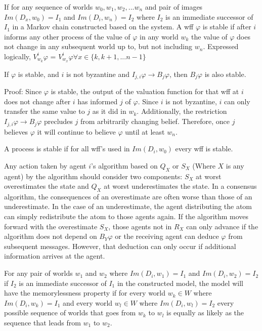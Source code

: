 \begin{pdef}
If for any sequence of worlds $w_0, w_1, w_2, ... w_n$ and pair of images $Im(D_x, w_0)=I_1$ and $Im(D_i, w_n)=I_2$ where $I_2$ is an immediate successor of $I_1$ in a Markov chain constructed based on the system. A wff $\varphi$ is stable if after $i$ informs any other process of the value of $\varphi$ in any world $w_k$ the value of $\varphi$ does not change in any subsequent world up to, but not including $w_n$. Expressed logically, $V^i_{w_k} \varphi$ = $V^i_{w_x} \varphi \forall x \in \{k, k+1, ... n-1\}$
\end{pdef}

\begin{thm}
If $\varphi$ is stable, and $i$ is not byzantine and $I_{j,i} \varphi \rightarrow B_j \varphi$, then $B_j \varphi$ is also stable.
\end{thm}

Proof: Since $\varphi$ is stable, the output of the valuation function for that wff at $i$ does not change after $i$ has informed $j$ of $\varphi$. Since $i$ is not byzantine, $i$ can only transfer the same value to $j$ as it did in $w_k$. Additionally, the restriction $I_{j,i} \varphi \rightarrow B_j \varphi$ precludes $j$ from arbitrarily changing belief. Therefore, once $j$ believes $\varphi$ it will continue to believe $\varphi$ until at least $w_n$.

\begin{pdef}
A process is stable if for all wff's used in $Im(D_i, w_0)$ every wff is stable.
\end{pdef}

Any action taken by agent $i$'s algorithm based on $Q_X$ or $S_X$ (Where $X$ is any agent) by the algorithm should consider two components: $S_X$ at worst overestimates the state and $Q_X$ at worst underestimates the state. In a consensus algorithm, the consequences of an overestimate are often worse than those of an underestimate. In the case of an underestimate, the agent distributing the atom can simply redistribute the atom to those agents again. If the algorithm moves forward with the overestimate $S_X$, those agents not in $R_X$ can only advance if the algorithm does not depend on $B_Y \varphi$ or the receiving agent can deduce $\varphi$ from subsequent messages. However, that deduction can only occur if additional information arrives at the agent.

\begin{thm}
For any pair of worlds $w_1$ and $w_2$ where $Im(D_i, w_1)=I_1$ and $Im(D_i, w_2)=I_2$ if $I_2$ is an immediate successor of $I_1$ in the constructed model, the model will have the memorylessness property if for every world $w_k \in W$ where $Im(D_i, w_k)=I_1$ and every world $w_l \in W$ where $Im(D_i, w_l)=I_2$ every possible sequence of worlds that goes from $w_k$ to $w_l$ is equally as likely as the sequence that leads from $w_1$ to $w_2$. 
\end{thm}

